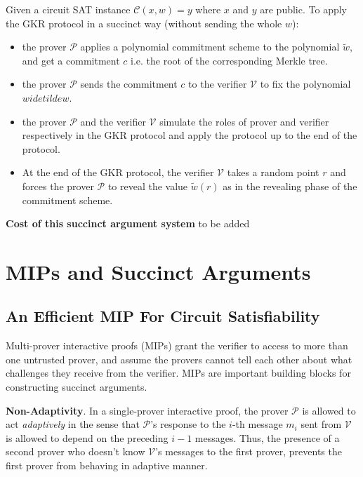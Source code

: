 \documentclass{article}
\begin{document}
\begin{boxx1}
Given a circuit SAT instance $\mathcal{C}(x, w) = y$ where $x$ and $y$ are public. To apply the GKR protocol in a succinct way (without sending the whole $w$): 
\begin{itemize}
\item the prover $\mathcal{P}$ applies a polynomial commitment scheme to the polynomial $\widetilde{w}$, and get a commitment $c$ i.e. the root of the corresponding Merkle tree. 
\item the prover $\mathcal{P}$ sends the commitment $c$ to the verifier $\mathcal{V}$ to fix the polynomial $widetilde{w}$. 
\item the prover $\mathcal{P}$ and the verifier $\mathcal{V}$ simulate the roles of prover and verifier respectively in the GKR protocol and apply the protocol up to the end of the protocol. 
\item At the end of the GKR protocol, the verifier $\mathcal{V}$ takes a random point $r$ and forces the prover $\mathcal{P}$ to reveal the value $\widetilde{w}(r)$ as in the revealing phase of the commitment scheme. 
\end{itemize}

\end{boxx1}

\textbf{Cost of this succinct argument system} \colorbox{BurntOrange}{to be added}

\section{MIPs and Succinct Arguments}

\subsection{An Efficient MIP For Circuit Satisfiability} \label{sec:1st-MIP}

Multi-prover interactive proofs (MIPs) grant the verifier to access to more than one untrusted prover, and assume the provers cannot tell each other about what challenges they receive from the verifier. MIPs are important building blocks for constructing succinct arguments. 

\textbf{Non-Adaptivity}. In a single-prover interactive proof, the prover $\mathcal{P}$ is allowed to act \textit{adaptively} in the sense that $\mathcal{P}$'s response to the $i$-th message $m_i$ sent from $\mathcal{V}$ is allowed to depend on the preceding $i-1$ messages. Thus, the presence of a second prover who doesn't know $\mathcal{V}$'s messages to the first prover, prevents the first prover from behaving in adaptive manner. 
\end{document}
